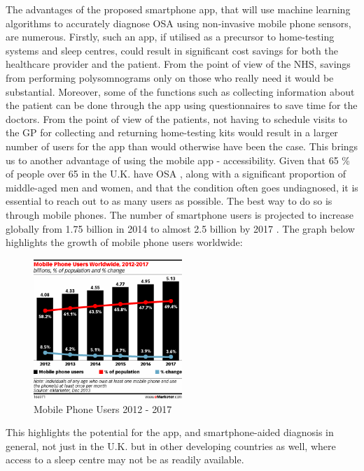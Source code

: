 The advantages of the proposed smartphone app, that will use machine learning algorithms to accurately diagnose OSA using non-invasive mobile phone sensors, are numerous. Firstly, such an app, if utilised as a precursor to home-testing systems and sleep centres, could result in significant cost savings for both the healthcare provider and the patient. From the point of view of the NHS, savings from performing polysomnograms only on those who really need it would be substantial. Moreover, some of the functions such as collecting information about the patient can be done through the app using questionnaires to save time for the doctors. From the point of view of the patients, not having to schedule visits to the GP for collecting and returning home-testing kits would result in a larger number of users for the app than would otherwise have been the case.
This brings us to another advantage of using the mobile app - accessibility. Given that 65 \% of people over 65 in the U.K. have OSA \cite{nhsmain}, along with a significant proportion of middle-aged men and women, and that the condition often goes undiagnosed, it is essential to reach out to as many users as possible. The best way to do so is through mobile phones. The number of smartphone users is projected to increase globally from 1.75 billion in 2014 to almost 2.5 billion by 2017 \cite{phoneusers}. The graph below highlights the growth of mobile phone users worldwide:

\begin{figure}[!ht]
\centering
\includegraphics[width=0.5\textwidth]{drawings/mobilephoneusers.png}
\caption{Mobile Phone Users 2012 - 2017 \cite{phoneusers}}
\label{fig:mobilephoneusers}
\end{figure}

This highlights the potential for the app, and smartphone-aided diagnosis in general, not just in the U.K. but in other developing countries as well, where access to a sleep centre may not be as readily available.

